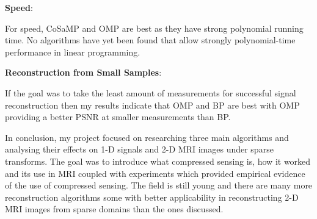\documentclass[titlepage,oneside, 12pt]{book}
\theoremstyle{break}
\begin{document}
\begin{flushleft}
\textbf{Speed}:
\end{flushleft}
For speed, CoSaMP and OMP are best as they have strong polynomial running time. No algorithms have yet been found that allow strongly polynomial-time performance in linear programming. 

\begin{flushleft}
\textbf{Reconstruction from Small Samples}:
\end{flushleft}
If the goal was to take the least amount of measurements for successful signal reconstruction then my results indicate that OMP and BP are best with OMP providing a better PSNR at smaller measurements than BP. 

\bigskip

In conclusion, my project focused on researching three main algorithms and analysing their effects on 1-D signals and 2-D MRI images under sparse transforms. The goal was to introduce what compressed sensing is, how it worked and its use in MRI coupled with experiments which provided empirical evidence of the use of compressed sensing. The field is still young and there are many more reconstruction algorithms some with better applicability in reconstructing 2-D MRI images from sparse domains than the ones discussed.  
\end{document}
